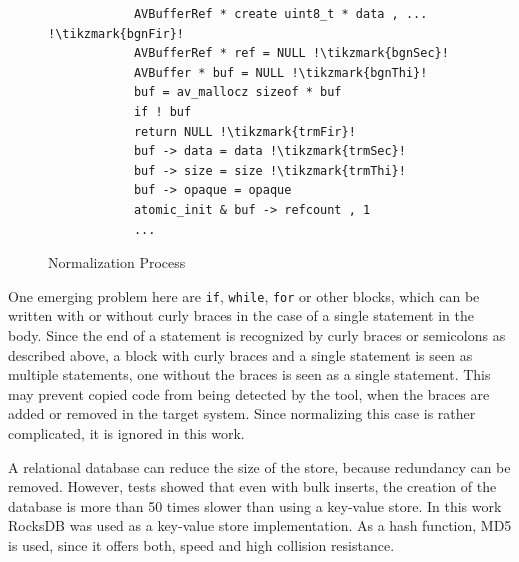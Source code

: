 \begin{figure}[h]
	\centering
	\begin{minipage}{1.2\linewidth}
		\begin{minipage}{0.35\linewidth}
			\scriptsize
			
		\end{minipage}
		\begin{minipage}{0.23\linewidth}
			\scriptsize
			\begin{lstlisting}
			AVBufferRef * create uint8_t * data , ... !\tikzmark{bgnFir}!
			AVBufferRef * ref = NULL !\tikzmark{bgnSec}!
			AVBuffer * buf = NULL !\tikzmark{bgnThi}!
			buf = av_mallocz sizeof * buf
			if ! buf
			return NULL !\tikzmark{trmFir}!
			buf -> data = data !\tikzmark{trmSec}!
			buf -> size = size !\tikzmark{trmThi}!
			buf -> opaque = opaque
			atomic_init & buf -> refcount , 1
			...
			\end{lstlisting}
			
			
		\end{minipage}
	\end{minipage}
	\caption{Normalization Process}\label{fig:normalization}
\end{figure}

One emerging problem here are \texttt{if}, \texttt{while}, \texttt{for} or other blocks, which can be written with or without curly braces in the case of a single statement in the body.
Since the end of a statement is recognized by curly braces or semicolons as described above, a block with curly braces and a single statement is seen as multiple statements, one without the braces is seen as a single statement.
This may prevent copied code from being detected by the tool, when the braces are added or removed in the target system.
Since normalizing this case is rather complicated, it is ignored in this work.


A relational database can reduce the size of the store, because redundancy can be removed.
However, tests showed that even with bulk inserts, the creation of the database is more than 50 times slower than using a key-value store.
In this work RocksDB was used as a key-value store implementation.
As a hash function, MD5 is used, since it offers both, speed and high collision resistance.

